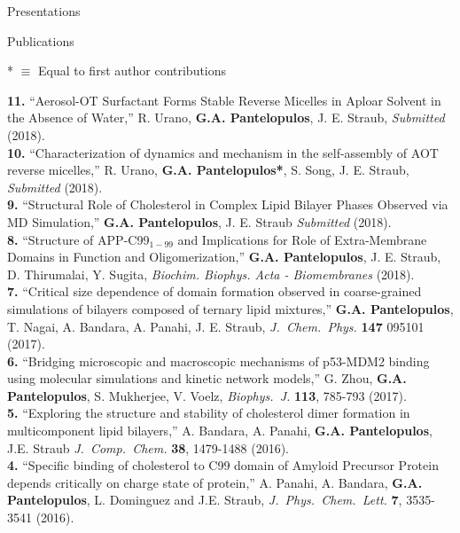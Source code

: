 \documentclass[a4paper]{article}
\def\jcc{\it J.~Comp.~Chem.}
\def\jpcl{\it J.~Phys.~Chem.~Lett.}
\def\jcp{\it J.~Chem.~Phys.}
\def\bj{\it Biophys.~J.}
\def\jpcl{\it J.~Phys.~Chem.~Lett.}
\begin{document}
\begin{rubrique}{Presentations}
\end{rubrique}

\begin{rubrique}{Publications}
\end{rubrique}
* $\equiv$ Equal to first author contributions

{\bf 11.} ``Aerosol-OT Surfactant Forms Stable Reverse Micelles in Aploar Solvent in the Absence of Water,'' R. Urano, \textbf{G.A. Pantelopulos}, J. E. Straub, \textit{Submitted} (2018). \\
{\bf 10.} ``Characterization of dynamics and mechanism in the self-assembly of AOT reverse micelles,'' R. Urano, \textbf{G.A. Pantelopulos*}, S. Song, J. E. Straub, \textit{Submitted} (2018). \\
{\bf 9.} ``Structural Role of Cholesterol in Complex Lipid Bilayer Phases Observed via MD Simulation,'' \textbf{G.A. Pantelopulos}, J. E. Straub \textit{Submitted} (2018). \\
{\bf 8.} ``Structure of APP-C99$_{1-99}$ and Implications for Role of Extra-Membrane Domains in Function and Oligomerization,'' \textbf{G.A. Pantelopulos}, J. E. Straub, D. Thirumalai, Y. Sugita, \textit{Biochim. Biophys. Acta - Biomembranes} (2018). \\
{\bf 7.} ``Critical size dependence of domain formation observed in coarse-grained simulations of bilayers composed of ternary lipid mixtures,'' \textbf{G.A. Pantelopulos}, T. Nagai, A. Bandara, A. Panahi, J. E. Straub, {\jcp} {\bf 147} 095101 (2017). \\
{\bf 6.} ``Bridging microscopic and macroscopic mechanisms of p53-MDM2 binding using molecular simulations and kinetic network models,'' G. Zhou, \textbf{G.A. Pantelopulos}, S. Mukherjee, V. Voelz, {\bj} {\bf 113},  785-793 (2017). \\
{\bf 5.} ``Exploring the structure and stability of cholesterol dimer formation in multicomponent lipid bilayers,'' A. Bandara, A. Panahi, \textbf{G.A. Pantelopulos}, J.E. Straub {\jcc} {\bf 38}, 1479-1488 (2016). \\
{\bf 4.}  ``Specific binding of cholesterol to C99 domain of Amyloid Precursor Protein depends critically on charge state of protein,'' A. Panahi, A. Bandara, \textbf{G.A. Pantelopulos}, L. Dominguez and J.E. Straub, {\jpcl} {\bf 7}, 3535-3541 (2016). \\
\end{document}
